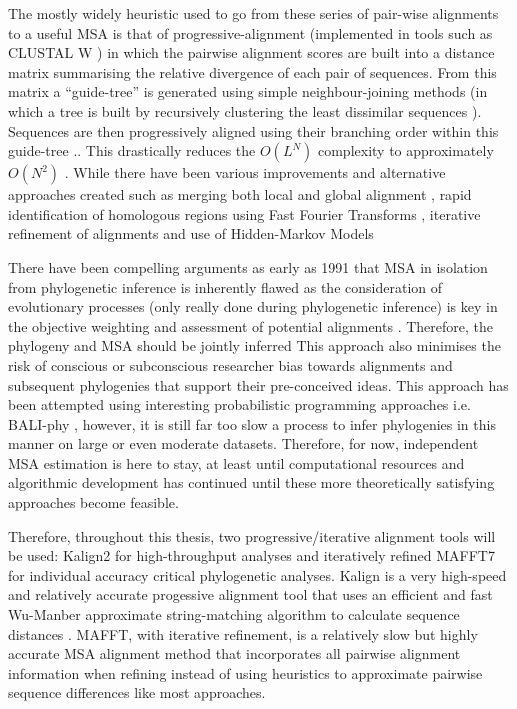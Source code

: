 The mostly widely heuristic used to go from these series of pair-wise alignments to
a useful MSA is that of progressive-alignment \citep{Feng1987} (implemented in 
tools such as CLUSTAL W \citep{Thompson1994}) in which the pairwise alignment
scores are built into a distance matrix summarising the relative divergence of 
each pair of sequences. From this matrix a ``guide-tree'' is generated using simple
neighbour-joining methods (in which a tree is built by recursively clustering
the least dissimilar sequences \citep{Saitou1987}).  Sequences are then progressively
aligned using their branching order within this guide-tree \citep{Thompson1994}..
This drastically reduces the \(O(L^{N})\) complexity to approximately \(O(N^{2})\)
\citep{Sievers2011}. While there have been various improvements and alternative approaches
created such as merging both local and global alignment \citep{Notredame2000}, 
rapid identification of homologous regions using Fast Fourier Transforms \citep{Katoh2002},
iterative refinement of alignments \citep{Edgar2004a} and use of Hidden-Markov Models \citep{Eddy1995}


There have been compelling arguments as early as 1991 that MSA in isolation from
phylogenetic inference is inherently flawed as the consideration of 
evolutionary processes (only really done during phylogenetic inference) 
is key in the objective weighting and assessment of potential alignments \citep{Thorne1991}.
Therefore, the phylogeny and MSA should be jointly inferred \citep{Thorne1991,Redelings2005,Bouchard-Cote2013}
This approach also minimises the risk of conscious or subconscious researcher bias 
towards alignments and subsequent phylogenies that support their pre-conceived ideas.
This approach has been attempted using interesting probabilistic programming approaches
i.e. BALI-phy \citep{Suchard2006}, however, it is still far too
slow a process to infer phylogenies in this manner on large or even moderate datasets.
Therefore, for now, independent MSA estimation is here to stay, at least until
computational resources and algorithmic development has continued until these more
theoretically satisfying approaches become feasible.  

Therefore, throughout this thesis, two progressive/iterative alignment tools will be used:
Kalign2 \citep{Lassmann2005,Lassmann2009} for high-throughput analyses and iteratively refined 
MAFFT7 \citep{Katoh2002,Katoh2005,Katoh2013} for individual accuracy critical phylogenetic analyses. 
Kalign is a very high-speed and relatively accurate \citep{Thompson2011} progessive alignment tool that uses
an efficient and fast Wu-Manber approximate string-matching algorithm to calculate sequence distances
\citep{Lassmann2005}.  MAFFT, with iterative refinement, is a relatively slow but highly accurate
MSA alignment method \citep{Thompson2011} that incorporates all pairwise alignment information when refining
instead of using heuristics to approximate pairwise sequence differences like most approaches.


